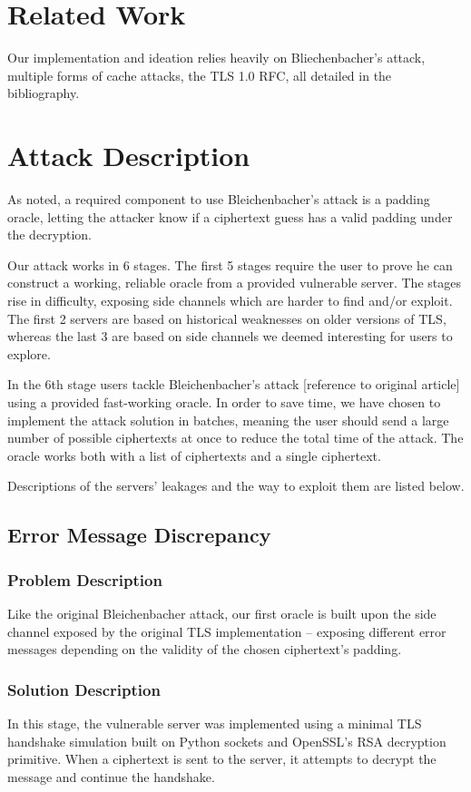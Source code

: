 \documentclass[sigconf]{acmart}
\begin{document}
\section{Related Work}
Our implementation and ideation relies heavily on Bliechenbacher's attack, multiple forms of cache attacks, the TLS 1.0 RFC, all detailed in the bibliography.

\section{Attack Description}
As noted, a required component to use Bleichenbacher’s attack is a padding oracle, letting the attacker know if a ciphertext guess has a valid padding under the decryption.

Our attack works in 6 stages. The first 5 stages require the user to prove he can construct a working, reliable oracle from a provided vulnerable server. The stages rise in difficulty, exposing side channels which are harder to find and/or exploit. The first 2 servers are based on historical weaknesses on older versions of TLS, whereas the last 3 are based on side channels we deemed interesting for users to explore.

In the 6th stage users tackle Bleichenbacher's attack [reference to original article] using a provided fast-working oracle. In order to save time, we have chosen to implement the attack solution in batches, meaning the user should send a large number of possible ciphertexts at once to reduce the total time of the attack. The oracle works both with a list of ciphertexts and a single ciphertext.

Descriptions of the servers’ leakages and the way to exploit them are listed below.

\subsection{Error Message Discrepancy}
\subsubsection{Problem Description}
Like the original Bleichenbacher attack, our first oracle is built upon the side channel exposed by the original TLS implementation – exposing different error messages depending on the validity of the chosen ciphertext’s padding.

\subsubsection{Solution Description}
In this stage, the vulnerable server was implemented using a minimal TLS handshake simulation built on Python sockets and OpenSSL’s RSA decryption primitive. When a ciphertext is sent to the server, it attempts to decrypt the message and continue the handshake.
\end{document}

